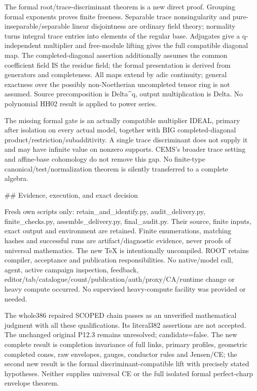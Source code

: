 \documentclass[11pt]{article}
\begin{document}
\begin{QualifiedData}
The formal root/trace-discriminant theorem is a new direct proof. Grouping formal exponents proves finite freeness. Separable trace nonsingularity and pure-inseparable/separable linear disjointness are ordinary field theory; normality turns integral trace entries into elements of the regular base. Adjugates give a q-independent multiplier and free-module lifting gives the full compatible diagonal map. The completed-diagonal assertion additionally assumes the common coefficient field IS the residue field; the formal presentation is derived from generators and completeness. All maps extend by adic continuity; general exactness over the possibly non-Noetherian uncompleted tensor ring is not assumed. Source precomposition is Delta^q, output multiplication is Delta. No polynomial HH02 result is applied to power series.

The missing formal gate is an actually compatible multiplier IDEAL, primary after isolation on every actual model, together with BIG completed-diagonal product/restriction/subadditivity. A single trace discriminant does not supply it and may have infinite value on nonzero supports. CEMS's broader trace setting and affine-base cohomology do not remove this gap. No finite-type canonical/test/normalization theorem is silently transferred to a complete algebra.

## Evidence, execution, and exact decision

Fresh own scripts only: retain_and_identify.py, audit_delivery.py, finite_checks.py, assemble_delivery.py, final_audit.py. Their source, finite inputs, exact output and environment are retained. Finite enumerations, matching hashes and successful runs are artifact/diagnostic evidence, never proofs of universal mathematics. The new TeX is intentionally uncompiled. ROOT retains compiler, acceptance and publication responsibilities. No native/model call, agent, active campaign inspection, feedback, editor/tab/catalogue/count/publication/auth/proxy/CA/runtime change or heavy compute occurred. No supervised heavy-compute facility was provided or needed.

The whole386 repaired SCOPED chain passes as an unverified mathematical judgment with all these qualifications. Its literal382 assertions are not accepted. The unchanged original P12.3 remains unresolved; candidate=false. The new complete result is completion invariance of full links, primary profiles, geometric completed cones, raw envelopes, gauges, conductor rules and Jensen/CE; the second new result is the formal discriminant-compatible lift with precisely stated hypotheses. Neither supplies universal CE or the full isolated formal perfect-charp envelope theorem.
\end{QualifiedData}
\end{document}
